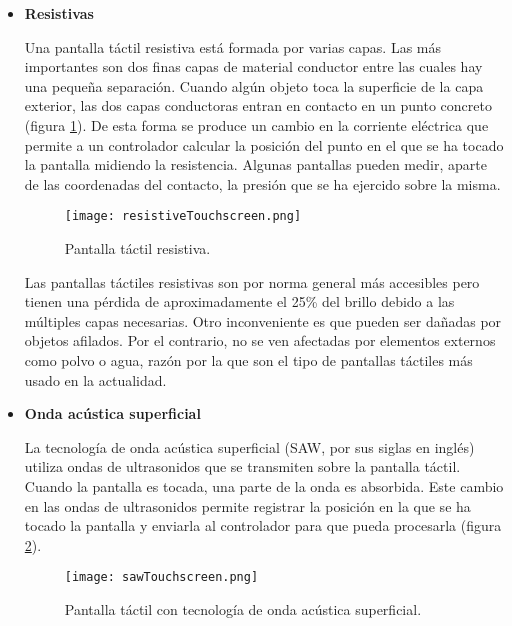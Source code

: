 \begin{itemize}
\item \textbf{Resistivas}

Una pantalla táctil resistiva está formada por varias capas. Las más 
importantes son dos finas capas de material conductor entre las cuales hay una 
pequeña separación. Cuando algún objeto toca la superficie de la capa exterior, 
las dos capas conductoras entran en contacto en un punto concreto
(figura \ref{fig:resistiveTouchscreen}). De esta forma se produce un cambio en 
la corriente eléctrica que permite a un controlador calcular la posición del 
punto en el que se ha tocado la pantalla midiendo la resistencia. Algunas 
pantallas pueden medir, aparte de las coordenadas del contacto, la presión que 
se ha ejercido sobre la misma.

  \begin{figure}[h]
    \begin{center}
      \texttt{[image: resistiveTouchscreen.png]}
      \caption{Pantalla táctil resistiva.}
      \label{fig:resistiveTouchscreen}
    \end{center}
  \end{figure}

Las pantallas táctiles resistivas son por norma general más accesibles pero 
tienen una pérdida de aproximadamente el 25\% del brillo debido a las múltiples 
capas necesarias. Otro inconveniente es que pueden ser dañadas por 
objetos afilados. Por el contrario, no se ven afectadas por elementos externos 
como polvo o agua, razón por la que son el tipo de pantallas táctiles más usado 
en la actualidad.

\item \textbf{Onda acústica superficial}

La tecnología de onda acústica superficial (\acs{SAW}, por sus siglas en 
inglés) utiliza ondas de ultrasonidos que se transmiten sobre la pantalla 
táctil. Cuando la pantalla es tocada, una parte de la onda es absorbida. Este 
cambio en las ondas de ultrasonidos permite registrar la posición en la que se 
ha tocado la pantalla y enviarla al controlador para que pueda procesarla
(figura \ref{fig:sawTouchscreen}).

  \begin{figure}[h]
    \begin{center}
      \texttt{[image: sawTouchscreen.png]}
      \caption{Pantalla táctil con tecnología de onda acústica
      superficial.}
      \label{fig:sawTouchscreen}
    \end{center}
  \end{figure}


\end{itemize}
